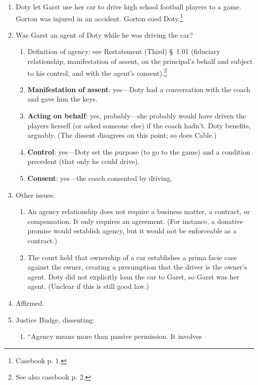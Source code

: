 \begin{enumerate}
    \item Doty let Garst use her car to drive high school football players to 
    a game.  Gorton was injured in an accident. Gorton sued 
    Doty.\footnote{Casebook p.  1.}
    \item Was Garst an agent of Doty while he was driving the car?
    \begin{enumerate}
        \item Definition of agency: see Restatement (Third) \S\ 1.01 
        (fiduciary relationship, manifestation of assent, on the principal's 
        behalf and subject to his control, and with the agent's 
        consent).\footnote{See also casebook p. 2.}
        \item \textbf{Manifestation of assent}: yes---Doty had a conversation 
        with the coach and gave him the keys.
        \item \textbf{Acting on behalf}: yes, probably---she probably would 
        have driven the players herself (or asked someone else) if the coach 
        hadn't. Doty benefits, arguably. (The dissent disagrees on this 
        point; so does Cable.)
        \item \textbf{Control}: yes---Doty set the purpose (to go to the game) 
        and a condition precedent (that only he could drive).
        \item \textbf{Consent}: yes---the coach consented by driving.
    \end{enumerate}
    \item Other issues:
    \begin{enumerate}
        \item An agency relationship does not require a business matter, a 
        contract, or compensation. It only requires an agreement. (For 
        instance, a donative promise would establish agency, but it would not 
        be enforceable as a contract.)
        \item The court held that ownership of a car establishes a prima facie 
        case against the owner, creating a presumption that the driver is 
        the owner's agent. Doty did not explicitly loan the car to Garst, so 
        Garst was her agent. (Unclear if this is still good law.)
    \end{enumerate}
    \item Affirmed.
    \item Justice Budge, dissenting:
    \begin{enumerate}
        \item ``Agency means more than passive permission. It involves 

\end{enumerate}
\end{enumerate}
